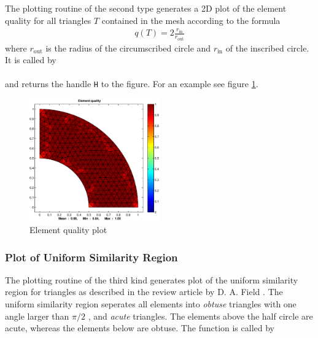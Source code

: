  The plotting routine of the second type generates a 2D plot of the element quality for all triangles $T$ contained in the mesh according to the formula
\begin{eqnarray}
\label{eq:ELEM_QUAL}
  q(T) = 2\frac{r_{\operatorname{in}}}{r_{\operatorname{out}}}
\end{eqnarray}
where $r_{\operatorname{out}}$ is the radius of the circumscribed circle and $r_{\operatorname{in}}$ of the inscribed
circle. %
It is called by \\

 \\

\noindent and returns the handle {\tt H} to the figure. %
For an example see figure \ref{fig:ELEM_QUAL}.

\begin{figure}[htb]
  \centering
  \includegraphics[width=0.5\textwidth]{qual.eps}
  \caption{Element quality plot}
  \label{fig:ELEM_QUAL}
\end{figure}


\subsubsection{Plot of Uniform Similarity Region} 
 
 The plotting routine of the third kind generates plot of the uniform similarity region for triangles as described in the review article by D. A. Field \cite{FIE00}. The uniform similarity region seperates all elements into {\em obtuse} triangles with one angle larger than $\pi/2$ , and {\em acute} triangles. The elements above the half circle are acute, whereas the elements below are obtuse. %
The function  is called by \\

